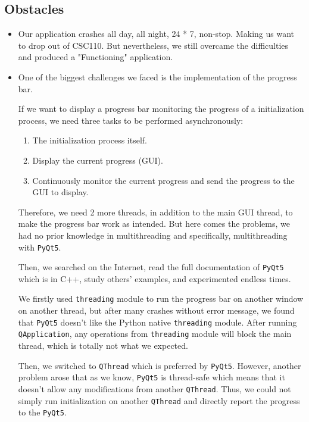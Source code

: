 \documentclass[fontsize=11pt]{article}
\begin{document}
    \subsection{Obstacles}

    \begin{itemize}
        \item Our application crashes all day, all night, 24 * 7, non-stop. Making us want to drop out of CSC110. But nevertheless, we still overcame the difficulties and produced a "Functioning" application.
        \item One of the biggest challenges we faced is the implementation of the progress bar.
        
        If we want to display a progress bar monitoring the progress of a initialization process, we need three tasks to be performed asynchronously:
        \begin{enumerate}
            \item The initialization process itself.
            \item Display the current progress (GUI).
            \item Continuously monitor the current progress and send the progress to the GUI to display.
        \end{enumerate}

        Therefore, we need 2 more threads, in addition to the main GUI thread, to make the progress bar work as intended. But here comes the problems, we had no prior knowledge in multithreading and specifically, multithreading with \verb|PyQt5|. 

        Then, we searched on the Internet, read the full documentation of \verb|PyQt5| which is in C++, study others' examples, and experimented endless times.
        
        We firstly used \verb|threading| module to run the progress bar on another window on another thread, but after many crashes without error message, we found that \verb|PyQt5| doesn't like the Python native \verb|threading| module. After running \verb|QApplication|, any operations from \verb|threading| module will block the main thread, which is totally not what we expected.

        Then, we switched to \verb|QThread| which is preferred by \verb|PyQt5|. However, another problem arose that as we know, \verb|PyQt5| is thread-safe which means that it doesn't allow any modifications from another \verb|QThread|. Thus, we could not simply run initialization on another \verb|QThread| and directly report the progress to the \verb|PyQt5|.


\end{itemize}
\end{document}
